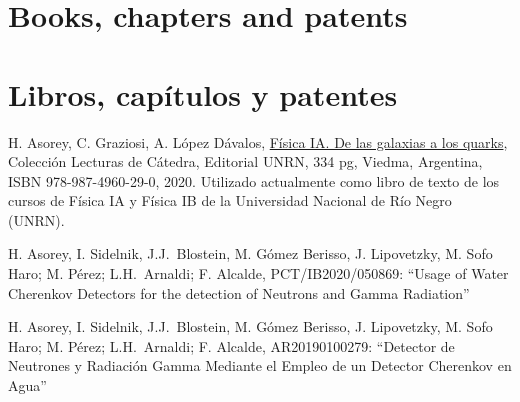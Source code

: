 \ifeng
\section*{Books, chapters and patents}
\else
\section*{Libros, capítulos y patentes}
\fi
\noindent
\begin{etaremune}
    \item {} H. Asorey, C. Graziosi, A. López Dávalos, \href{https://editorial.unrn.edu.ar/index.php/catalogo/346/view_bl/62/lecturas-de-catedra/92/fisica-ia-de-las-galaxias-a-los-quarks}{Física IA. De las galaxias a los quarks}, Colección Lecturas de Cátedra, Editorial UNRN, 334 pg, Viedma, Argentina, ISBN 978-987-4960-29-0, 2020.
    Utilizado actualmente como libro de texto de los cursos de Física IA y Física IB de la Universidad Nacional de Río Negro (UNRN).
    \item {} H. Asorey, I. Sidelnik, J.J.\ Blostein, M. Gómez Berisso, J. Lipovetzky, M. Sofo Haro; M. Pérez; L.H.\ Arnaldi; F. Alcalde, PCT/IB2020/050869: ``Usage of Water Cherenkov Detectors for the detection of Neutrons and Gamma Radiation''
    \item {} H. Asorey, I. Sidelnik, J.J.\ Blostein, M. Gómez Berisso, J. Lipovetzky, M. Sofo Haro; M. Pérez; L.H.\ Arnaldi; F. Alcalde, AR20190100279: ``Detector de Neutrones y Radiación Gamma Mediante el Empleo de un Detector Cherenkov en Agua''
\end{etaremune}